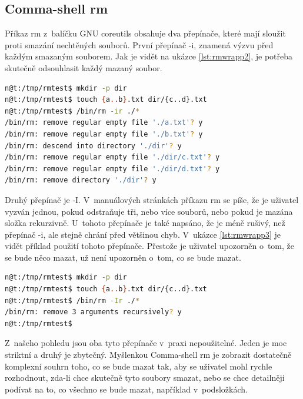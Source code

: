 \documentclass[thesis=M,czech]{FITthesis}[2012/06/26]
\begin{document}
%
\subsection{Comma-shell rm}

Příkaz rm z~balíčku GNU coreutils obsahuje dva přepínače, které mají sloužit proti smazání nechtěných souborů. První přepínač -i, znamená výzvu před každým smazaným souborem. Jak je vidět na ukázce \ref{lst:rmwrapp2}, je potřeba skutečně odsouhlasit každý mazaný soubor.

\begin{minipage}{\linewidth}
\begin{lstlisting}[language=bash, caption={rm}, label={lst:rmwrapp2}]
n@t:/tmp/rmtest$ mkdir -p dir
n@t:/tmp/rmtest$ touch {a..b}.txt dir/{c..d}.txt
n@t:/tmp/rmtest$ /bin/rm -ir ./*
/bin/rm: remove regular empty file './a.txt'? y
/bin/rm: remove regular empty file './b.txt'? y
/bin/rm: descend into directory './dir'? y
/bin/rm: remove regular empty file './dir/c.txt'? y
/bin/rm: remove regular empty file './dir/d.txt'? y
/bin/rm: remove directory './dir'? y
\end{lstlisting}
\end{minipage}

Druhý přepínač je -I. V~manuálových stránkách příkazu rm se píše, že je uživatel vyzván jednou, pokud odstraňuje tři, nebo více souborů, nebo pokud je mazána složka rekurzivně. U~tohoto přepínače je také napsáno, že je méně rušivý, než přepínač -i, ale stejně chrání před většinou chyb. V~ukázce \ref{lst:rmwrapp3} je vidět příklad použití tohoto přepínače. Přestože je uživatel upozorněn o~tom, že se bude něco mazat, už není upozorněn o~tom, co se bude mazat.

\begin{minipage}{\linewidth}
\begin{lstlisting}[language=bash, caption={rm s~}, label={lst:rmwrapp3}]
n@t:/tmp/rmtest$ mkdir -p dir
n@t:/tmp/rmtest$ touch {a..b}.txt dir/{c..d}.txt
n@t:/tmp/rmtest$ /bin/rm -Ir ./*
/bin/rm: remove 3 arguments recursively? y
n@t:/tmp/rmtest$
\end{lstlisting}
\end{minipage}

Z~našeho pohledu jsou oba tyto přepínače v~praxi nepoužitelné. Jeden je moc striktní a druhý je zbytečný. Myšlenkou Comma-shell rm je zobrazit dostatečně komplexní souhrn toho, co se bude mazat tak, aby se uživatel mohl rychle rozhodnout, zda-li chce skutečně tyto soubory smazat, nebo se chce detailněji podívat na to, co všechno se bude mazat, například v~podsložkách.
\end{document}
